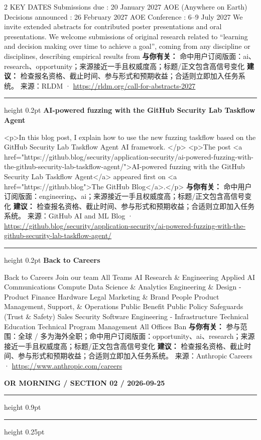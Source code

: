 \documentclass[10.5pt]{ctexart}
\begin{document}
\begin{multicols}{2}
KEY DATES Submissions due : 20 January 2027 AOE (Anywhere on Earth) Decisions announced : 26 February 2027 AOE Conference : 6–9 July 2027 We invite extended abstracts for contributed poster presentations and oral presentations. We welcome submissions of original research related to “learning and decision making over time to achieve a goal”, coming from any discipline or disciplines, describing empirical results from 
\textbf{与你有关：} 命中用户订阅版面：ai、research、opportunity；来源接近一手且权威度高；标题/正文包含高信号变化
\textbf{建议：} 检查报名资格、截止时间、参与形式和预期收益；合适则立即加入任务系统。
{\footnotesize\color{ormuted} 来源：RLDM · \url{https://rldm.org/call-for-abstracts-2027}}
\vspace{2mm}
\hrule height 0.2pt
\vspace{2mm}
{\large\bfseries AI-powered fuzzing with the GitHub Security Lab Taskflow Agent}\par
<p>In this blog post, I explain how to use the new fuzzing taskflow based on the GitHub Security Lab Taskflow Agent AI framework. </p> <p>The post <a href="https://github.blog/security/application-security/ai-powered-fuzzing-with-the-github-security-lab-taskflow-agent/">AI-powered fuzzing with the GitHub Security Lab Taskflow Agent</a> appeared first on <a href="https://github.blog">The GitHub Blog</a>.</p>
\textbf{与你有关：} 命中用户订阅版面：engineering、ai；来源接近一手且权威度高；标题/正文包含高信号变化
\textbf{建议：} 检查报名资格、截止时间、参与形式和预期收益；合适则立即加入任务系统。
{\footnotesize\color{ormuted} 来源：GitHub AI and ML Blog · \url{https://github.blog/security/application-security/ai-powered-fuzzing-with-the-github-security-lab-taskflow-agent/}}
\vspace{2mm}
\hrule height 0.2pt
\vspace{2mm}
{\large\bfseries Back to Careers}\par
Back to Careers Join our team All Teams AI Research \& Engineering Applied AI Communications Compute Data Science \& Analytics Engineering \& Design - Product Finance Hardware Legal Marketing \& Brand People Product Management, Support, \& Operations Public Benefit Public Policy Safeguards (Trust \& Safety) Sales Security Software Engineering - Infrastructure Technical Education Technical Program Management All Offices Ban
\textbf{与你有关：} 参与范围：全球 / 多为海外全职；命中用户订阅版面：opportunity、ai、research；来源接近一手且权威度高；标题/正文包含高信号变化
\textbf{建议：} 检查报名资格、截止时间、参与形式和预期收益；合适则立即加入任务系统。
{\footnotesize\color{ormuted} 来源：Anthropic Careers · \url{https://www.anthropic.com/careers}}
\end{multicols}
\newpage
{\small\bfseries OR MORNING / SECTION 02 / 2026-09-25}
\vspace{2mm}
\hrule height 0.9pt
\vspace{1.5mm}
\hrule height 0.25pt
\vspace{4mm}
\end{document}
